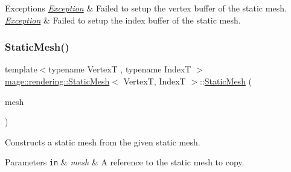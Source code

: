 \begin{DoxyExceptions}{Exceptions}
{\em \hyperlink{classmage_1_1_exception}{Exception}} & Failed to setup the vertex buffer of the static mesh. \\
\hline
{\em \hyperlink{classmage_1_1_exception}{Exception}} & Failed to setup the index buffer of the static mesh. \\
\hline
\end{DoxyExceptions}
\hypertarget{classmage_1_1rendering_1_1_static_mesh_a0e824924504f75bbfa578caf0637dd2a}{}\label{classmage_1_1rendering_1_1_static_mesh_a0e824924504f75bbfa578caf0637dd2a} 
\subsubsection{\texorpdfstring{Static\+Mesh()}{StaticMesh()}\hspace{0.1cm}{\footnotesize\ttfamily [2/3]}}
{\footnotesize\ttfamily template$<$typename VertexT , typename IndexT $>$ \\
\hyperlink{classmage_1_1rendering_1_1_static_mesh}{mage\+::rendering\+::\+Static\+Mesh}$<$ VertexT, IndexT $>$\+::\hyperlink{classmage_1_1rendering_1_1_static_mesh}{Static\+Mesh} (\begin{DoxyParamCaption}\item[{const \hyperlink{classmage_1_1rendering_1_1_static_mesh}{Static\+Mesh}$<$ VertexT, IndexT $>$ \&}]{mesh }\end{DoxyParamCaption})\hspace{0.3cm}{\ttfamily [delete]}}

Constructs a static mesh from the given static mesh.


\begin{DoxyParams}[1]{Parameters}
\mbox{\tt in}  & {\em mesh} & A reference to the static mesh to copy. \\
\hline
\end{DoxyParams}
\hypertarget{classmage_1_1rendering_1_1_static_mesh_a7cf948089fc5ceae5284bab45f216a75}{}\label{classmage_1_1rendering_1_1_static_mesh_a7cf948089fc5ceae5284bab45f216a75} 
